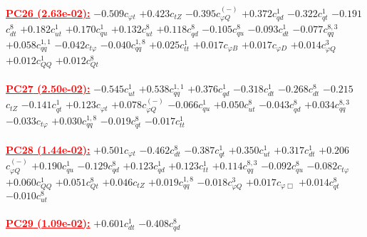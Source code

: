 \documentclass{article}
\begin{document}
 \nonumber \\ \nonumber \\ 
\noindent \textcolor{red}{\underline{\bf{PC26} (2.63e-02):}}
{$-0.509$}{\rm $c_{\varphi t}$} 
{$+0.423$}{\rm $c_{tZ}$} 
{$-0.395$}{\rm $c_{\varphi Q}^{(-)}$} 
{$+0.372$}{\rm $c_{qd}^{1}$} 
{$-0.322$}{\rm $c_{qt}^{1}$} 
{$-0.191$}{\rm $c_{dt}^{8}$} 
{$+0.182$}{\rm $c_{ut}^{1}$} 
{$+0.170$}{\rm $c_{qu}^{1}$} 
{$+0.132$}{\rm $c_{ut}^{8}$} 
{$+0.118$}{\rm $c_{qd}^{8}$} 
{$-0.105$}{\rm $c_{qu}^{8}$} 
{$-0.093$}{\rm $c_{dt}^{1}$} 
{$-0.077$}{\rm $c_{qq}^{8,3}$} 
{$+0.058$}{\rm $c_{qq}^{1,1}$} 
{$-0.042$}{\rm $c_{t \varphi}$} 
{$-0.040$}{\rm $c_{qq}^{1,8}$} 
{$+0.025$}{\rm $c_{tt}^{1}$} 
{$+0.017$}{\rm $c_{\varphi B}$} 
{$+0.017$}{\rm $c_{\varphi D}$} 
{$+0.014$}{\rm $c_{\varphi Q}^{3}$} 
{$+0.012$}{\rm $c_{QQ}^{1}$} 
{$+0.012$}{\rm $c_{Qt}^{8}$} 
 \nonumber \\ \nonumber \\ 
\noindent \textcolor{red}{\underline{\bf{PC27} (2.50e-02):}}
{$-0.545$}{\rm $c_{ut}^{1}$} 
{$+0.538$}{\rm $c_{qq}^{1,1}$} 
{$+0.376$}{\rm $c_{qd}^{1}$} 
{$-0.318$}{\rm $c_{dt}^{1}$} 
{$-0.268$}{\rm $c_{dt}^{8}$} 
{$-0.215$}{\rm $c_{tZ}$} 
{$-0.141$}{\rm $c_{qt}^{1}$} 
{$+0.123$}{\rm $c_{\varphi t}$} 
{$+0.078$}{\rm $c_{\varphi Q}^{(-)}$} 
{$-0.066$}{\rm $c_{qu}^{1}$} 
{$+0.050$}{\rm $c_{ut}^{8}$} 
{$-0.043$}{\rm $c_{qd}^{8}$} 
{$+0.034$}{\rm $c_{qq}^{8,3}$} 
{$-0.033$}{\rm $c_{t \varphi}$} 
{$+0.030$}{\rm $c_{qq}^{1,8}$} 
{$-0.019$}{\rm $c_{qt}^{8}$} 
{$-0.017$}{\rm $c_{tt}^{1}$} 
 \nonumber \\ \nonumber \\ 
\noindent \textcolor{red}{\underline{\bf{PC28} (1.44e-02):}}
{$+0.501$}{\rm $c_{\varphi t}$} 
{$-0.462$}{\rm $c_{dt}^{8}$} 
{$-0.387$}{\rm $c_{qt}^{1}$} 
{$+0.350$}{\rm $c_{ut}^{1}$} 
{$+0.317$}{\rm $c_{dt}^{1}$} 
{$+0.206$}{\rm $c_{\varphi Q}^{(-)}$} 
{$+0.190$}{\rm $c_{qu}^{1}$} 
{$-0.129$}{\rm $c_{qd}^{8}$} 
{$+0.123$}{\rm $c_{qd}^{1}$} 
{$+0.123$}{\rm $c_{tt}^{1}$} 
{$+0.114$}{\rm $c_{qq}^{8,3}$} 
{$-0.092$}{\rm $c_{qu}^{8}$} 
{$-0.082$}{\rm $c_{t \varphi}$} 
{$+0.060$}{\rm $c_{QQ}^{1}$} 
{$+0.051$}{\rm $c_{Qt}^{8}$} 
{$+0.046$}{\rm $c_{tZ}$} 
{$+0.019$}{\rm $c_{qq}^{1,8}$} 
{$-0.018$}{\rm $c_{\varphi Q}^{3}$} 
{$+0.017$}{\rm $c_{\varphi \Box}$} 
{$+0.014$}{\rm $c_{qt}^{8}$} 
{$-0.010$}{\rm $c_{ut}^{8}$} 
 \nonumber \\ \nonumber \\ 
\noindent \textcolor{red}{\underline{\bf{PC29} (1.09e-02):}}
{$+0.601$}{\rm $c_{dt}^{1}$} 
{$-0.408$}{\rm $c_{qd}^{8}$} 
\end{document}
